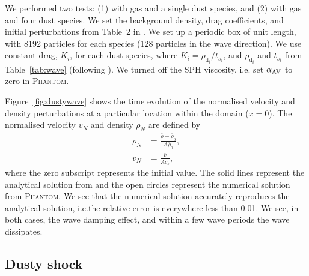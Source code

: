 \documentclass[fleqn,usenatbib]{mnras}
\newcommand{\dd}{\mathrm{d}}
\begin{document}
We performed two tests: (1) with gas and a single dust species, and (2) with gas
and four dust species. We set the background density, drag coefficients, and
initial perturbations from Table~2 in
\citet{Benitez-Llambay2019ApJS..241...25B}. We set up a periodic box of unit
length, with 8192 particles for each species (128 particles in the wave
direction). We use constant drag, \(K_i\), for each dust species, where \(K_i =
\rho_{\dd_i} / t_{s_i}\), and \(\rho_{\dd_i}\) and \(t_{s_i}\) from
Table~\ref{tab:wave} (following \citealt{Benitez-Llambay2019ApJS..241...25B}).
We turned off the SPH viscosity, i.e. set \(\alpha_{\rm AV}\) to zero in
\textsc{Phantom}.

Figure~\ref{fig:dustywave} shows the time evolution of the normalised velocity
and density perturbations at a particular location within the domain (\(x=0\)).
The normalised velocity \( v_N \) and density \( \rho_N \) are defined by
%
\begin{align}
   \rho_N &= \frac{\overline{\rho} - \overline{\rho}_0}{A \overline{\rho}_0}, \\
   v_N &= \frac{\overline{v}}{A c_s},
\end{align}
%
where the zero subscript represents the initial value. The solid lines represent
the analytical solution from \citet{Benitez-Llambay2019ApJS..241...25B} and the
open circles represent the numerical solution from \textsc{Phantom}. We see that
the numerical solution accurately reproduces the analytical solution, i.e.\@ the
relative error is everywhere less than 0.01. We see, in both cases, the wave
damping effect, and within a few wave periods the wave dissipates.

\subsection{Dusty shock}%
\label{subsec:shock}
\end{document}
